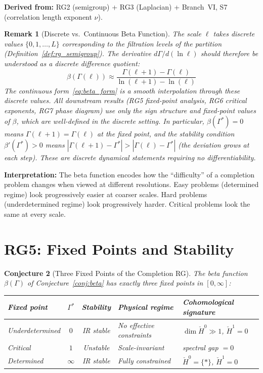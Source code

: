 \documentclass[11pt,letterpaper]{article}
\newtheorem{conjecture}{Conjecture}[section]
\newtheorem{remark}[conjecture]{Remark}
\newcommand{\Hcech}{\check{H}}
\begin{document}
\textbf{Derived from:} RG2 (semigroup) + RG3 (Laplacian) + 
Branch~VI, S7 (correlation length exponent $\nu$).

\begin{remark}[Discrete vs.\ Continuous Beta 
Function]\label{rem:discrete_beta}
The scale $\ell$ takes discrete values $\{0, 1, \ldots, L\}$ 
corresponding to the filtration levels of the partition 
(Definition~\ref{def:rg_semigroup}). The derivative 
$d\Gamma / d(\ln \ell)$ should therefore be understood as a 
discrete difference quotient:
\begin{equation}\label{eq:discrete_beta}
    \beta(\Gamma(\ell)) \approx 
    \frac{\Gamma(\ell + 1) - \Gamma(\ell)}
    {\ln(\ell + 1) - \ln(\ell)}
\end{equation}
The continuous form~\eqref{eq:beta_form} is a smooth interpolation 
through these discrete values. All downstream results (RG5 
fixed-point analysis, RG6 critical exponents, RG7 phase diagram) 
use only the sign structure and fixed-point values of $\beta$, 
which are well-defined in the discrete setting. In particular, 
$\beta(\Gamma^*) = 0$ means $\Gamma(\ell + 1) = \Gamma(\ell)$ at 
the fixed point, and the stability condition $\beta'(\Gamma^*) > 0$ 
means $|\Gamma(\ell + 1) - \Gamma^*| > |\Gamma(\ell) - \Gamma^*|$ 
(the deviation grows at each step). These are discrete dynamical 
statements requiring no differentiability.
\end{remark}

\textbf{Interpretation:} The beta function encodes how the 
``difficulty'' of a completion problem changes when viewed at 
different resolutions. Easy problems (determined regime) look 
progressively easier at coarser scales. Hard problems 
(underdetermined regime) look progressively harder. Critical 
problems look the same at every scale.

\section{RG5: Fixed Points and Stability}

\begin{conjecture}[Three Fixed Points of the Completion 
RG]\label{conj:fixed_points}
The beta function $\beta(\Gamma)$ of Conjecture~\ref{conj:beta} has 
exactly three fixed points in $[0, \infty]$:

\begin{center}
\renewcommand{\arraystretch}{1.4}
\begin{tabular}{lccll}
\textbf{Fixed point} & $\Gamma^*$ & \textbf{Stability} 
& \textbf{Physical regime} & \textbf{Cohomological signature} \\
\hline
Underdetermined & $0$ & IR stable & No effective constraints 
& $\dim \Hcech^0 \gg 1$, $\Hcech^1 = 0$ \\
Critical & $1$ & Unstable & Scale-invariant 
& spectral gap $= 0$ \\
Determined & $\infty$ & IR stable & Fully constrained 
& $\Hcech^0 = \{*\}$, $\Hcech^1 = 0$ \\
\end{tabular}
\end{center}
\end{conjecture}
\end{document}
